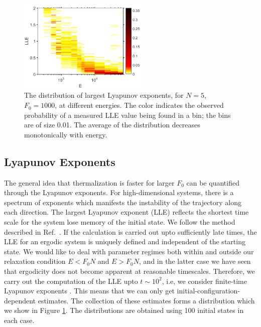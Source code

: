 \documentclass[a4paper, onecolumn]{revtex4-1}
\begin{document}
\begin{figure}[tb]
\centering
\includegraphics[width=0.55\textwidth]{ZhiyuPictures/LLEdistribution_1_11_pre_hot2_screenshot.png}
\caption{The distribution of largest Lyapunov exponents, for $N=5$, $F_0=1000$, at different
  energies.  The color indicates the observed probability of a measured LLE value being found in a
  bin; the bins are of size 0.01.  The average of the distribution decreases monotonically with
  energy.}  \label{fig:LLEdistribution1}
\end{figure}



\subsection{Lyapunov Exponents}

The general idea that thermalization is faster for larger $F_0$ can be quantified through the
Lyapunov exponents.  For high-dimensional systems, there is a spectrum of exponents which manifests
the instability of the trajectory along each direction. The largest Lyapunov exponent (LLE) reflects
the shortest time scale for the system lose memory of the initial state.  We follow the method
described in Ref.~\cite{EckmannRuelle_RMP85}.  If the calculation is carried out upto sufficiently
late times, the LLE for an ergodic system is uniquely defined and independent of the starting state.
We would like to deal with parameter regimes both within and outside our relaxation condition
$E<F_0N$ and $E>F_0N$, and in the latter case we have seen that ergodicity does not become apparent
at reasonable timescales.  Therefore, we carry out the computation of the LLE upto $t\sim10^2$, i.e,
we consider finite-time Lyapunov exponents \cite{FiniteTimeLyapunov}.  This means that we can only
get initial-configuration-dependent estimates.  The collection of these estimates forms a
distribution which we show in Figure \ref{fig:LLEdistribution1}.  The distributions are obtained
using 100 initial states in each case.
\end{document}
